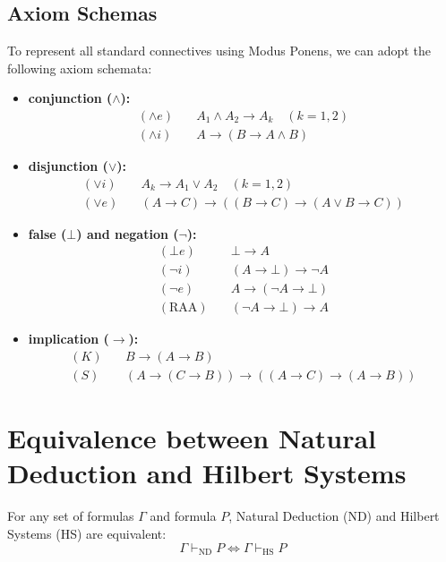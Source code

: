 \documentclass[a4paper, 11pt]{report}
\begin{document}
\subsection{Axiom Schemas}
To represent all standard connectives using Modus Ponens, we can adopt the following axiom schemata:

\begin{itemize}
    \item \textbf{conjunction ($\wedge$):}
    \begin{align*}
        (\wedge e) & \quad A_1 \wedge A_2 \to A_k \quad (k = 1, 2) \\
        (\wedge i) & \quad A \to (B \to A \wedge B)
    \end{align*}
    \item \textbf{disjunction ($\vee$):}
    \begin{align*}
        (\vee i) & \quad A_k \to A_1 \vee A_2 \quad (k = 1, 2) \\
        (\vee e) & \quad (A \to C) \to ((B \to C) \to (A \vee B \to C))
    \end{align*}
    \item \textbf{false ($\bot$) and negation ($\neg$):}
    \begin{align*}
        (\bot e) & \quad \bot \to A \\
        (\neg i) & \quad (A \to \bot) \to \neg A \\
        (\neg e) & \quad A \to (\neg A \to \bot) \\
        (\text{RAA}) & \quad (\neg A \to \bot) \to A
    \end{align*}
    \item \textbf{implication ($\to$):}
    \begin{align*}
        (K) & \quad B \to (A \to B) \\
        (S) & \quad (A \to (C \to B)) \to ((A \to C) \to (A \to B))
    \end{align*}
\end{itemize}

\section{Equivalence between Natural Deduction and Hilbert Systems}

\begin{thmframe}{}{}
For any set of formulas $\Gamma$ and formula $P$, Natural Deduction (ND) and Hilbert Systems (HS) are equivalent:
\[
    \Gamma \vdash_{\text{ND}} P \iff \Gamma \vdash_{\text{HS}} P
\]
\end{thmframe}
\end{document}
